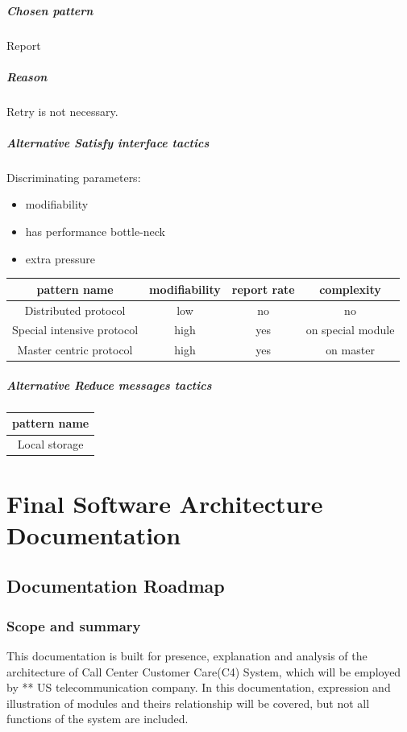\documentclass{article}
\begin{document}
		\subparagraph{Chosen pattern} 
		Report
		\subparagraph{Reason} 
		Retry is not necessary.


		\subparagraph{Alternative Satisfy interface tactics}
		Discriminating parameters:\\
		\begin{itemize}
			\item modifiability
			\item has performance bottle-neck
			\item extra pressure
		\end{itemize}
		\begin{center}
			\begin{tabular}{|c|c|c|c|}
				\hline
				pattern name & modifiability & report rate & complexity\\
				\hline
				Distributed protocol & low & no & no \\
				\hline
				Special intensive protocol& high & yes & on special module\\
				\hline
				Master centric protocol & high & yes & on master\\
				\hline
			\end{tabular}
		\end{center}

		\subparagraph{Alternative Reduce messages tactics}
		\begin{center}
			\begin{tabular}{|c|}
				\hline
				pattern name \\
				\hline
				Local storage\\
				\hline
			\end{tabular}
		\end{center}
		
		

	\section{Final Software Architecture Documentation}
	\subsection{Documentation Roadmap}
	\subsubsection{Scope and summary}
	This documentation is built for presence, explanation and analysis of the architecture of Call Center Customer Care(C4) System, which will be employed by ** US telecommunication company. In this documentation, expression and illustration of modules and theirs relationship will be covered, but not all functions of the system are included.
\end{document}
